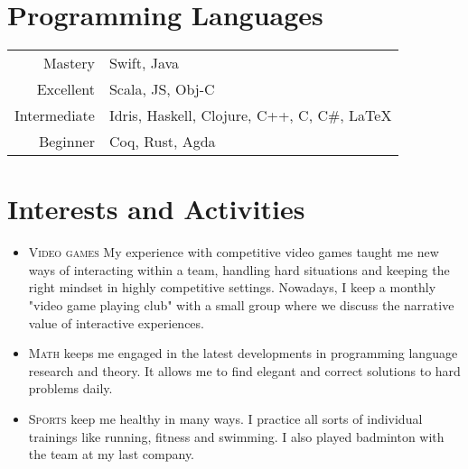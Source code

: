 \documentclass[a4paper,10pt]{article} %
\begin{document}
\section{Programming Languages}

\begin{tabular}{r|l}
Mastery & Swift, Java\\
Excellent & Scala, JS, Obj-C\\
Intermediate & Idris, Haskell, Clojure, C++, C, C\#, \LaTeX\\
Beginner & Coq, Rust, Agda\\
\end{tabular}

\section{Interests and Activities}
\begin{itemize}
	\item \textsc{Video games} My experience with competitive video games taught me new ways of interacting within a team, handling hard situations and keeping the right mindset in highly competitive settings. Nowadays, I keep a monthly "video game playing club" with a small group where we discuss the narrative value of interactive experiences.
	\item \textsc{Math} keeps me engaged in the latest developments in programming language research and theory. It allows me to find elegant and correct solutions to hard problems daily.
	\item \textsc{Sports} keep me healthy in many ways. I practice all sorts of individual trainings like running, fitness and swimming. I also played badminton with the team at my last company.
\end{itemize}
\end{document}

